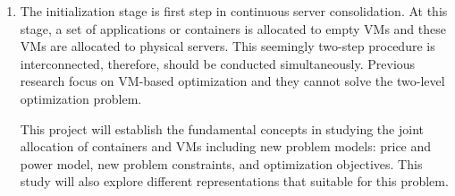 \begin{enumerate}
\item The initialization stage is first step in continuous server consolidation.
At this stage, a set of applications or  containers is allocated to empty VMs and these VMs are allocated to physical servers. This seemingly two-step procedure is interconnected, therefore, should be conducted simultaneously. Previous research \cite{Jennings:2015ht} focus on VM-based optimization and they cannot solve the two-level optimization problem.  

This project will establish the fundamental concepts in studying the joint allocation of containers and VMs including new problem models: price and power model, new problem constraints, and optimization objectives. This study will also explore different representations that suitable for this problem. 


\end{enumerate}

